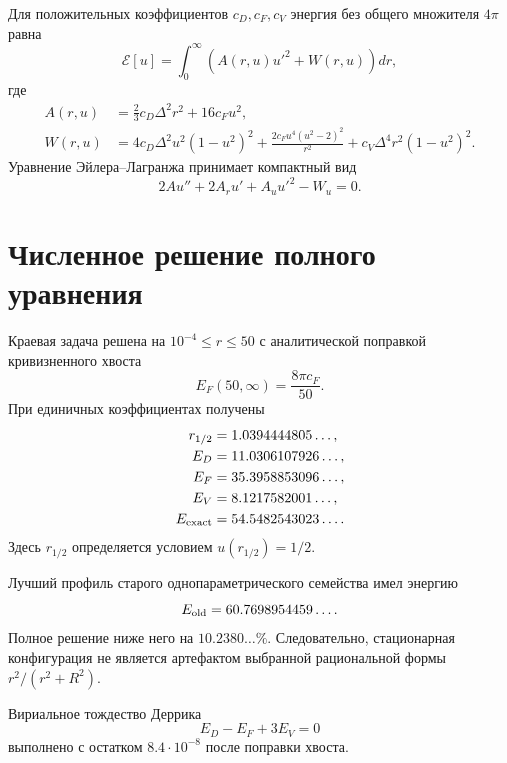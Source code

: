 Для положительных коэффициентов $c_D,c_F,c_V$ энергия без общего множителя
$4\pi$ равна
\begin{equation}
 \mathcal E[u]=\int_0^\infty
 \left(A(r,u)u'^2+W(r,u)\right)dr,
 \label{eq:v6-bosonic-radial-functional}
\end{equation}
где
\begin{align}
 A(r,u)&=\frac23c_D\Delta^2r^2+16c_Fu^2,\\
 W(r,u)&=4c_D\Delta^2u^2(1-u^2)^2
 +\frac{2c_Fu^4(u^2-2)^2}{r^2}
 +c_V\Delta^4r^2(1-u^2)^2.
\end{align}
Уравнение Эйлера--Лагранжа принимает компактный вид
\begin{equation}
 2A u''+2A_r u'+A_u u'^2-W_u=0.
 \label{eq:v6-bosonic-radial-euler-lagrange}
\end{equation}

\section{Численное решение полного уравнения}

Краевая задача решена на $10^{-4}\le r\le50$ с аналитической поправкой
кривизненного хвоста
\begin{equation}
 E_F(50,\infty)=\frac{8\pi c_F}{50}.
\end{equation}
При единичных коэффициентах получены
\begin{align}
 r_{1/2}&=1.0394444805\ldots,\\
 E_D&=11.0306107926\ldots,\\
 E_F&=35.3958853096\ldots,\\
 E_V&=8.1217582001\ldots,\\
 E_{\rm exact}&=54.5482543023\ldots.
 \label{eq:v6-bosonic-exact-radial-energy}
\end{align}
Здесь $r_{1/2}$ определяется условием $u(r_{1/2})=1/2$.

Лучший профиль старого однопараметрического семейства имел энергию
\begin{equation}
 E_{\rm old}=60.7698954459\ldots.
\end{equation}
Полное решение ниже него на $10.2380\ldots\%$.
Следовательно, стационарная конфигурация не является артефактом выбранной
рациональной формы $r^2/(r^2+R^2)$.

Вириальное тождество Деррика
\begin{equation}
 E_D-E_F+3E_V=0
 \label{eq:v6-bosonic-radial-virial-identity}
\end{equation}
выполнено с остатком $8.4\cdot10^{-8}$ после поправки хвоста.

